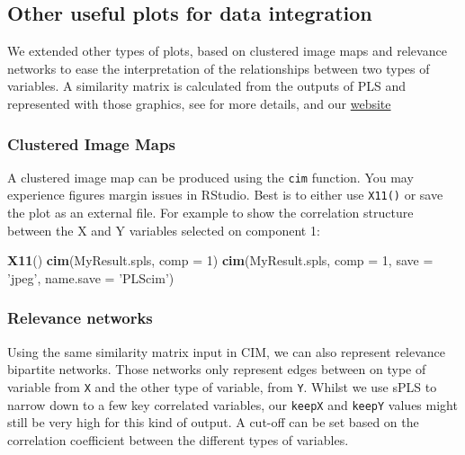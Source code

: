 \documentclass[]{book}
\newenvironment{Shaded}{\begin{snugshade}}{\end{snugshade}}
\newcommand{\DataTypeTok}[1]{\textcolor[rgb]{0.13,0.29,0.53}{#1}}
\newcommand{\DecValTok}[1]{\textcolor[rgb]{0.00,0.00,0.81}{#1}}
\newcommand{\KeywordTok}[1]{\textcolor[rgb]{0.13,0.29,0.53}{\textbf{#1}}}
\newcommand{\NormalTok}[1]{#1}
\newcommand{\StringTok}[1]{\textcolor[rgb]{0.31,0.60,0.02}{#1}}
\begin{document}
\hypertarget{other-useful-plots-for-data-integration}{%
\subsection{Other useful plots for data integration}\label{other-useful-plots-for-data-integration}}

We extended other types of plots, based on clustered image maps and relevance networks to ease the interpretation of the relationships between two types of variables. A similarity matrix is calculated from the outputs of PLS and represented with those graphics, see \citep{Gon12} for more details, and our \href{http://mixomics.org/graphics/variable-plots/}{website}

\hypertarget{clustered-image-maps}{%
\subsubsection{Clustered Image Maps}\label{clustered-image-maps}}

A clustered image map can be produced using the \texttt{cim} function. You may experience figures margin issues in RStudio. Best is to either use \texttt{X11()} or save the plot as an external file. For example to show the correlation structure between the X and Y variables selected on component 1:

\begin{Shaded}
\begin{Highlighting}[]
\KeywordTok{X11}\NormalTok{()}
\KeywordTok{cim}\NormalTok{(MyResult.spls, }\DataTypeTok{comp =} \DecValTok{1}\NormalTok{)}
\KeywordTok{cim}\NormalTok{(MyResult.spls, }\DataTypeTok{comp =} \DecValTok{1}\NormalTok{, }\DataTypeTok{save =} \StringTok{'jpeg'}\NormalTok{, }\DataTypeTok{name.save =} \StringTok{'PLScim'}\NormalTok{)}
\end{Highlighting}
\end{Shaded}

\hypertarget{pls:network}{%
\subsubsection{Relevance networks}\label{pls:network}}

Using the same similarity matrix input in CIM, we can also represent relevance bipartite networks. Those networks only represent edges between on type of variable from \texttt{X} and the other type of variable, from \texttt{Y}. Whilst we use sPLS to narrow down to a few key correlated variables, our \texttt{keepX} and \texttt{keepY} values might still be very high for this kind of output. A cut-off can be set based on the correlation coefficient between the different types of variables.
\end{document}
